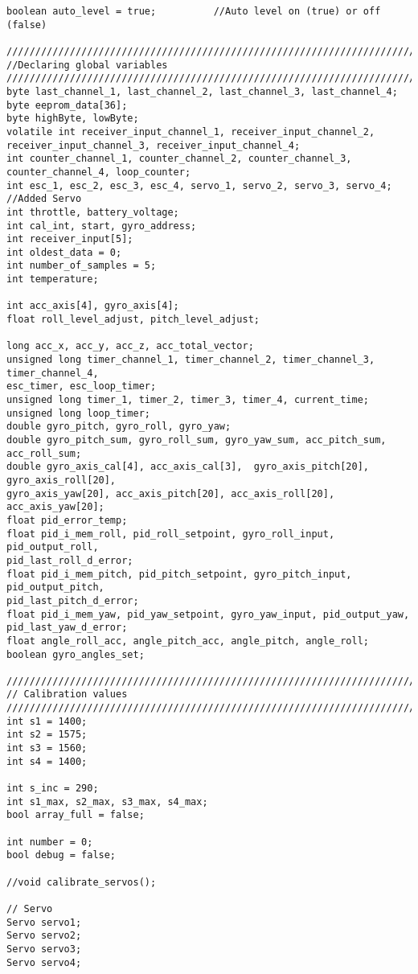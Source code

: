 \begin{lstlisting}
boolean auto_level = true;          //Auto level on (true) or off (false)

////////////////////////////////////////////////////////////////////////////////////////
//Declaring global variables
////////////////////////////////////////////////////////////////////////////////////////
byte last_channel_1, last_channel_2, last_channel_3, last_channel_4;
byte eeprom_data[36];
byte highByte, lowByte;
volatile int receiver_input_channel_1, receiver_input_channel_2, 
receiver_input_channel_3, receiver_input_channel_4;
int counter_channel_1, counter_channel_2, counter_channel_3, 
counter_channel_4, loop_counter;
int esc_1, esc_2, esc_3, esc_4, servo_1, servo_2, servo_3, servo_4; //Added Servo
int throttle, battery_voltage;
int cal_int, start, gyro_address;
int receiver_input[5];
int oldest_data = 0;
int number_of_samples = 5;
int temperature;

int acc_axis[4], gyro_axis[4];
float roll_level_adjust, pitch_level_adjust;

long acc_x, acc_y, acc_z, acc_total_vector;
unsigned long timer_channel_1, timer_channel_2, timer_channel_3, timer_channel_4, 
esc_timer, esc_loop_timer;
unsigned long timer_1, timer_2, timer_3, timer_4, current_time;
unsigned long loop_timer;
double gyro_pitch, gyro_roll, gyro_yaw;
double gyro_pitch_sum, gyro_roll_sum, gyro_yaw_sum, acc_pitch_sum, acc_roll_sum;
double gyro_axis_cal[4], acc_axis_cal[3],  gyro_axis_pitch[20], gyro_axis_roll[20], 
gyro_axis_yaw[20], acc_axis_pitch[20], acc_axis_roll[20], acc_axis_yaw[20];
float pid_error_temp;
float pid_i_mem_roll, pid_roll_setpoint, gyro_roll_input, pid_output_roll, 
pid_last_roll_d_error;
float pid_i_mem_pitch, pid_pitch_setpoint, gyro_pitch_input, pid_output_pitch, 
pid_last_pitch_d_error;
float pid_i_mem_yaw, pid_yaw_setpoint, gyro_yaw_input, pid_output_yaw, 
pid_last_yaw_d_error;
float angle_roll_acc, angle_pitch_acc, angle_pitch, angle_roll;
boolean gyro_angles_set;

////////////////////////////////////////////////////////////////////////////////////////
// Calibration values
////////////////////////////////////////////////////////////////////////////////////////
int s1 = 1400;
int s2 = 1575;
int s3 = 1560;
int s4 = 1400;
 
int s_inc = 290;
int s1_max, s2_max, s3_max, s4_max;
bool array_full = false;

int number = 0;
bool debug = false;

//void calibrate_servos();
 
// Servo
Servo servo1;
Servo servo2;
Servo servo3;
Servo servo4;


\end{lstlisting}
